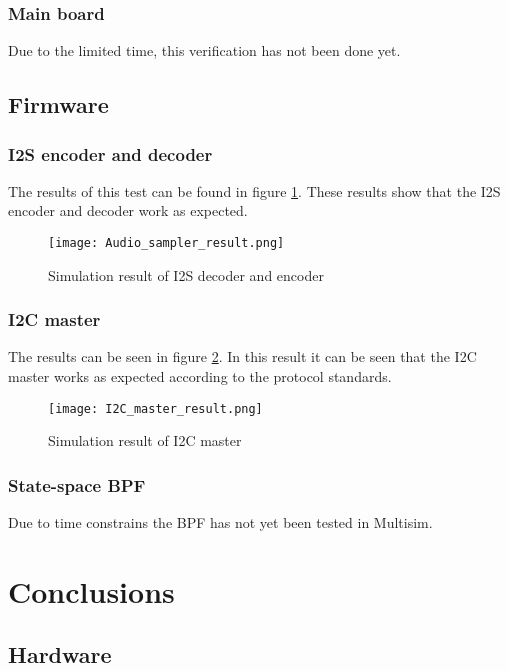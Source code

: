 \subsubsection{Main board}
Due to the limited time, this verification has not been done yet.

\subsection{Firmware}
\subsubsection{I2S encoder and decoder}
The results of this test can be found in figure \ref{fig:i2s-dec-enc}. These results show that the I2S encoder and decoder work as expected. 

\begin{figure}[!ht]
    \texttt{[image: Audio\_sampler\_result.png]}
    \caption{Simulation result of I2S decoder and encoder}
    \label{fig:i2s-dec-enc}
\end{figure}

\subsubsection{I2C master}
The results can be seen in figure \ref{fig:i2c-master}. In this result it can be seen that the I2C master works as expected according to the protocol standards.

\begin{figure}[!ht]
    \texttt{[image: I2C\_master\_result.png]}
    \caption{Simulation result of I2C master}
    \label{fig:i2c-master}
\end{figure}

\subsubsection{State-space BPF}
Due to time constrains the BPF has not yet been tested in Multisim. 

\section{Conclusions}

\subsection{Hardware}

